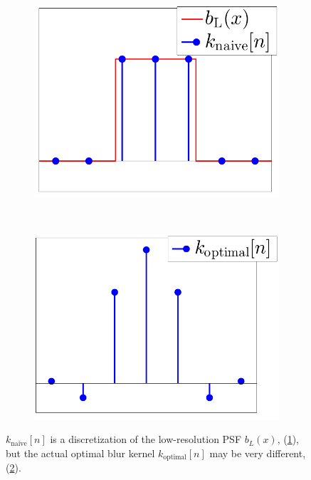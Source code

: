 \documentclass[11pt]{article}
\begin{document}
\begin{figure}
	\centering
	\begin{subfigure}[b]{0.4\textwidth}
		\centering
		\includegraphics[width=\textwidth]{1DBlurNaive.png}
		\caption{}
		\label{fig:1DBlurNaive}
	\end{subfigure}
	~
	\begin{subfigure}[b]{0.42\textwidth}
		\centering
		\includegraphics[width=\textwidth]{1DBlurComputed.png}
		\caption{}
		\label{fig:1DBlurComputed}
	\end{subfigure}
	\caption{$k_{\text{naive}}[n]$ is a discretization of the low-resolution PSF $b_L(x)$, (\ref{fig:1DBlurNaive}), but the actual optimal blur kernel $k_{\text{optimal}}[n]$ may be very different, (\ref{fig:1DBlurComputed}).}
	\label{fig:1DBlur}
\end{figure}
\end{document}

